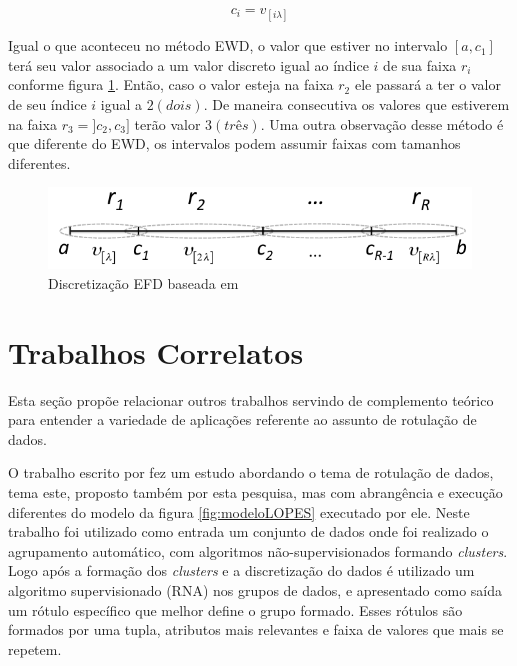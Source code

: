 \begin{equation}
c_i = v_{[i\lambda]}
 \label{eq:pontocorteEFD}
\end{equation}

Igual o que aconteceu no método EWD, o valor que estiver no intervalo ${[a,c_1]}$ terá seu valor associado a um valor discreto igual ao índice ${i}$ de sua faixa ${r_i}$ conforme figura \ref{fig:faixasEFD}. Então, caso o valor esteja na faixa ${r_2}$ ele passará a ter o valor de seu índice ${i}$ igual a ${2(dois)}$. De maneira consecutiva os valores que estiverem na faixa ${r_3=]c_2,c_3]}$ terão valor ${3(três)}$. Uma outra observação desse método é que diferente do EWD, os intervalos podem assumir faixas com tamanhos diferentes.

\begin{figure}[h]
        \centering
        \includegraphics[scale=0.6]{figs/discretizacaoEFD.png}
        \caption[Discretização EFD]{Discretização EFD baseada em \cite{LOPES2014}} 
        \label{fig:faixasEFD}
\end{figure} 


\section{Trabalhos Correlatos}\label{cap:refTeor:sec:trabcorrel}

Esta seção propõe relacionar outros trabalhos servindo de complemento teórico para entender a variedade de aplicações referente ao assunto de rotulação de dados.

O trabalho escrito por  fez um estudo abordando o tema de rotulação de dados, tema este, proposto também por esta pesquisa, mas com abrangência e execução diferentes do modelo da figura \ref{fig:modeloLOPES} executado por ele. Neste trabalho foi utilizado como entrada um conjunto de dados onde foi realizado o agrupamento automático, com algoritmos não-supervisionados formando  \textit{clusters}. Logo após a formação dos \textit{clusters} e a discretização do dados é utilizado um algoritmo supervisionado (RNA) nos grupos de dados, e apresentado como saída um rótulo específico que melhor define o grupo formado. Esses rótulos são formados por uma tupla, atributos mais relevantes e faixa de valores que mais se repetem.

